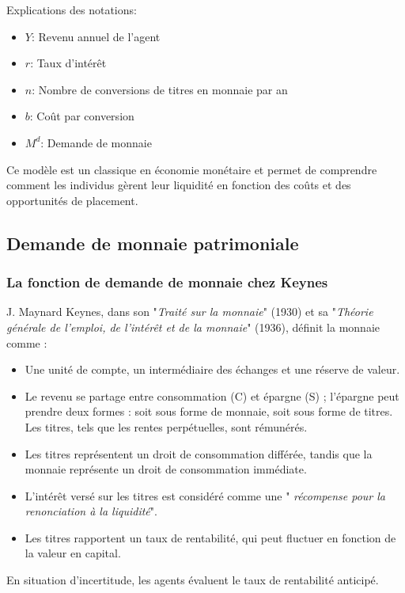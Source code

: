 \documentclass[a4paper, 12pt]{report}
\begin{document}
Explications des notations:
\begin{itemize}
	\item $Y$: Revenu annuel de l'agent
	\item $r$: Taux d'intérêt
	\item $n$: Nombre de conversions de titres en monnaie par an
	\item $b$: Coût par conversion
	\item $M^d$: Demande de monnaie
\end{itemize}

Ce modèle est un classique en économie monétaire et permet de comprendre comment les individus gèrent leur liquidité en fonction des coûts et des opportunités de placement.

	
\subsection{Demande de monnaie patrimoniale}

\subsubsection{La fonction de demande de monnaie chez Keynes}

J. Maynard Keynes, dans son "\textit{Traité sur la monnaie}" (1930) et sa "\textit{Théorie générale de l'emploi, de l'intérêt et de la monnaie}" (1936), définit la monnaie comme :
\begin{itemize}
	\item Une unité de compte, un intermédiaire des échanges et une réserve de valeur.
	\item Le revenu se partage entre consommation (C) et épargne (S) ; l'épargne peut prendre deux formes : soit sous forme de monnaie, soit sous forme de titres. Les titres, tels que les rentes perpétuelles, sont rémunérés.
	\item Les titres représentent un droit de consommation différée, tandis que la monnaie représente un droit de consommation immédiate.
	\item L'intérêt versé sur les titres est considéré comme une " \textit{récompense pour la renonciation à la liquidité}".
	\item Les titres rapportent un taux de rentabilité, qui peut fluctuer en fonction de la valeur en capital.
\end{itemize}

En situation d'incertitude, les agents évaluent le taux de rentabilité anticipé.
\end{document}
